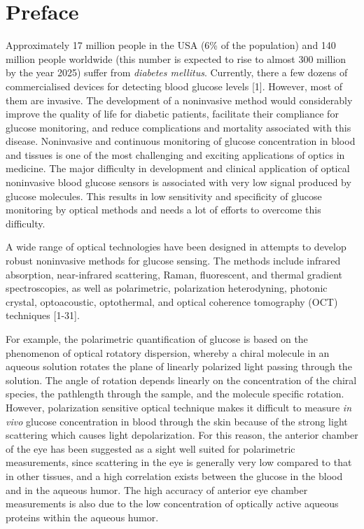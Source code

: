 \chapter*{Preface}
Approximately 17 million people in the USA (6{\%} of the
population) and 140 million people worldwide (this number is
expected to rise to almost 300 million by the year 2025) suffer
from \textit{diabetes mellitus}. Currently, there a few dozens of
commercialised devices for detecting blood glucose levels [1].
However, most of them are invasive. The development of a
noninvasive method would considerably improve the quality of life
for diabetic patients, facilitate their compliance for glucose
monitoring, and reduce complications and mortality associated with
this disease. Noninvasive and continuous monitoring of glucose
concentration in blood and tissues is one of the most challenging
and exciting applications of optics in medicine. The major
difficulty in development and clinical application of optical
noninvasive blood glucose sensors is associated with very low
signal produced by glucose molecules. This results in low
sensitivity and specificity of glucose monitoring by optical
methods and needs a lot of efforts to overcome this difficulty.

A wide range of optical technologies have been designed in
attempts to develop robust noninvasive methods for glucose
sensing. The methods include infrared absorption, near-infrared
scattering, Raman, fluorescent, and thermal gradient
spectroscopies, as well as polarimetric, polarization
heterodyning, photonic crystal, optoacoustic, optothermal, and
optical coherence tomography (OCT) techniques [1-31].

For example, the polarimetric quantification of glucose is based
on the phenomenon of optical rotatory dispersion, whereby a chiral
molecule in an aqueous solution rotates the plane of linearly
polarized light passing through the solution. The angle of
rotation depends linearly on the concentration of the chiral
species, the pathlength through the sample, and the molecule
specific rotation. However, polarization sensitive optical
technique makes it difficult to measure \textit{in vivo} glucose
concentration in blood through the skin because of the strong
light scattering which causes light depolarization. For this
reason, the anterior chamber of the eye has been suggested as a
sight well suited for polarimetric measurements, since scattering
in the eye is generally very low compared to that in other
tissues, and a high correlation exists between the glucose in the
blood and in the aqueous humor. The high accuracy of anterior eye
chamber measurements is also due to the low concentration of
optically active aqueous proteins within the aqueous humor.

